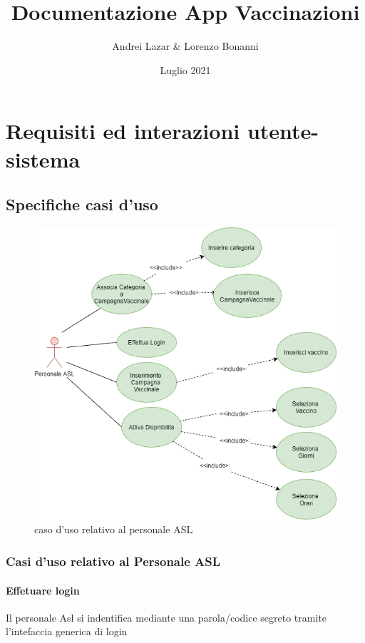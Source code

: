 \documentclass[a4paper,12pt,openany,oneside]{book}
\title{Documentazione App Vaccinazioni }
\author{Andrei Lazar & Lorenzo Bonanni }
\date{Luglio 2021}
\begin{document}
\maketitle
\pagestyle{plain}
\tableofcontents
\newenvironment{citazione}[1]
  {\newcommand{\lafonte}{#1}%
   \begin{quotation}}
  {\par\nobreak\raggedleft\relax[\lafonte]
   \end{quotation}}


\chapter{Requisiti ed interazioni utente-sistema}
\section{Specifiche casi d’uso}
\begin{figure}[h]
\centering
\includegraphics[width=0.4\columnwidth]{asl.png} 
\caption{caso d'uso relativo al personale ASL} 
\end{figure}
\subsection{Casi d'uso relativo al Personale ASL}
\subsubsection*{Effetuare login}
Il personale Asl si indentifica mediante una parola/codice segreto tramite l'intefaccia generica di login\\
\end{document}
